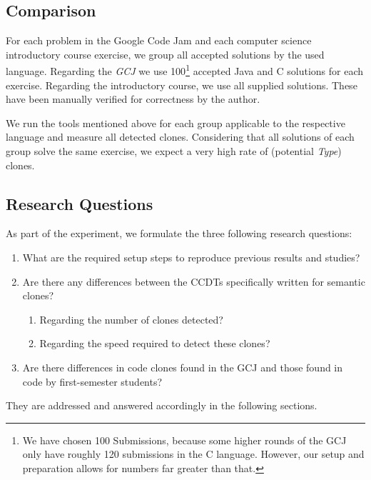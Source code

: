 \documentclass[10pt,journal,compsoc]{IEEEtran}
\def\T#1{\textsl{Type\nobreakdash-#1}}
\begin{document}
\subsection{Comparison}
For each problem in the Google Code Jam and each computer science introductory course exercise, we group all accepted solutions by the used language.
Regarding the \textsl{GCJ} we use 100\footnote{We have chosen 100 Submissions, because some higher rounds of the GCJ only have roughly 120 submissions in the C language. However, our setup and preparation allows for numbers far greater than that.} accepted Java and C solutions for each exercise. Regarding the introductory course, we use all supplied solutions. These have been manually verified for correctness by the author.

We run the tools mentioned above for each group applicable to the respective language and measure all detected clones.
Considering that all solutions of each group solve the same exercise, we expect a very high rate of (potential \T4) clones.




\subsection{Research Questions}
\label{subsec:research-question}As part of the experiment, we formulate the three following research questions:
\begin{enumerate}[label=RQ\arabic*),leftmargin=*]
  \item \label{rq-1}What are the required setup steps to reproduce previous results and studies?
  \item Are there any differences between the CCDTs specifically written for semantic clones?
  \begin{enumerate}[label=RQ1.\alph*),leftmargin=*,widest=R1.ii)]
    \item Regarding the number of clones detected?
    \item Regarding the speed required to detect these clones?
  \end{enumerate}
  \item Are there differences in code clones found in the GCJ and those found in code by first-semester students?
\end{enumerate}
They are addressed and answered accordingly in the following sections.
\end{document}

